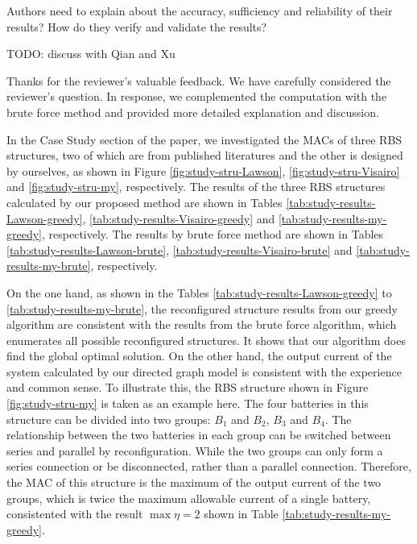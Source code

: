 \begin{revcomment}
  Authors need to explain about the accuracy, sufficiency and reliability of their results? How do they verify and validate the results?
\end{revcomment}
\begin{revresponse}

TODO: discuss with Qian and Xu

Thanks for the reviewer's valuable feedback. We have carefully considered the reviewer's question.
In response, we complemented the computation with the brute force method and provided more detailed explanation and discussion.


In the Case Study section of the paper, we investigated the MACs of three RBS structures, two of which are from published literatures \cite{lawsonSoftwareConfigurableBattery2012,visairoReconfigurableBatteryPack2008} and the other is designed by ourselves, as shown in Figure \ref{fig:study-stru-Lawson}, \ref{fig:study-stru-Visairo} and \ref{fig:study-stru-my}, respectively.
The results of the three RBS structures calculated by our proposed method are shown in Tables \ref{tab:study-results-Lawson-greedy}, \ref{tab:study-results-Visairo-greedy} and \ref{tab:study-results-my-greedy}, respectively.
The results by brute force method are shown in Tables \ref{tab:study-results-Lawson-brute}, \ref{tab:study-results-Visairo-brute} and \ref{tab:study-results-my-brute}, respectively.


On the one hand, as shown in the Tables \ref{tab:study-results-Lawson-greedy} to \ref{tab:study-results-my-brute}, the reconfigured structure results from our greedy algorithm are consistent with the results from the brute force algorithm, which enumerates all possible reconfigured structures.
It shows that our algorithm does find the global optimal solution.
On the other hand, the output current of the system calculated by our directed graph model is consistent with the experience and common sense.
To illustrate this, the RBS structure shown in Figure \ref{fig:study-stru-my} is taken as an example here.
The four batteries in this structure can be divided into two groups: $B_1$ and $B_2$, $B_3$ and $B_4$.
The relationship between the two batteries in each group can be switched between series and parallel by reconfiguration.
While the two groups can only form a series connection or be disconnected, rather than a parallel connection.
Therefore, the MAC of this structure is the maximum of the output current of the two groups, which is twice the maximum allowable current of a single battery, consistented with the result $\max \eta = 2$ shown in Table \ref{tab:study-results-my-greedy}.



\end{revresponse}
